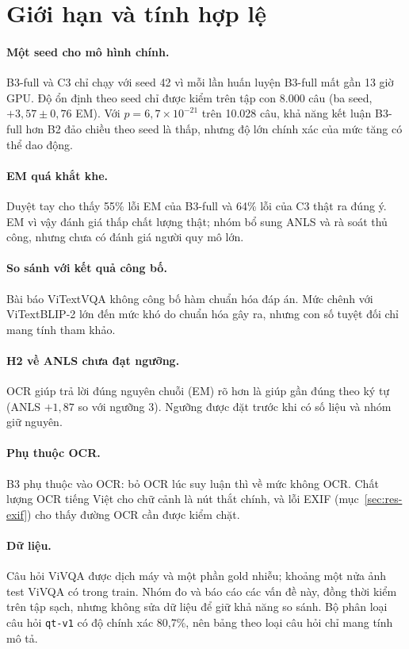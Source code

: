 \section{Giới hạn và tính hợp lệ}
\label{sec:dis-validity}

\paragraph{Một seed cho mô hình chính.} B3-full và C3 chỉ chạy với seed 42 vì mỗi
lần huấn luyện B3-full mất gần 13 giờ GPU. Độ ổn định theo seed chỉ được kiểm trên
tập con 8.000 câu (ba seed, $+3{,}57 \pm 0{,}76$ EM). Với $p = 6{,}7\times10^{-21}$
trên 10.028 câu, khả năng kết luận B3-full hơn B2 đảo chiều theo seed là thấp,
nhưng độ lớn chính xác của mức tăng có thể dao động.

\paragraph{EM quá khắt khe.} Duyệt tay cho thấy 55\% lỗi EM của B3-full và 64\%
lỗi của C3 thật ra đúng ý. EM vì vậy đánh giá thấp chất lượng thật; nhóm bổ sung
ANLS và rà soát thủ công, nhưng chưa có đánh giá người quy mô lớn.

\paragraph{So sánh với kết quả công bố.} Bài báo ViTextVQA không công bố hàm chuẩn
hóa đáp án. Mức chênh với ViTextBLIP-2 lớn đến mức khó do chuẩn hóa gây ra, nhưng
con số tuyệt đối chỉ mang tính tham khảo.

\paragraph{H2 về ANLS chưa đạt ngưỡng.} OCR giúp trả lời đúng nguyên chuỗi (EM) rõ
hơn là giúp gần đúng theo ký tự (ANLS $+1{,}87$ so với ngưỡng 3). Ngưỡng được đặt
trước khi có số liệu và nhóm giữ nguyên.

\paragraph{Phụ thuộc OCR.} B3 phụ thuộc vào OCR: bỏ OCR lúc suy luận thì về mức
không OCR. Chất lượng OCR tiếng Việt cho chữ cảnh là nút thắt chính, và lỗi
EXIF (mục~\ref{sec:res-exif}) cho thấy đường OCR cần được kiểm chặt.

\paragraph{Dữ liệu.} Câu hỏi ViVQA được dịch máy và một phần gold nhiễu; khoảng một
nửa ảnh test ViVQA có trong train. Nhóm đo và báo cáo các vấn đề này, đồng thời
kiểm trên tập sạch, nhưng không sửa dữ liệu để giữ khả năng so sánh. Bộ phân loại
câu hỏi \texttt{qt-v1} có độ chính xác 80,7\%, nên bảng theo loại câu hỏi chỉ mang
tính mô tả.

